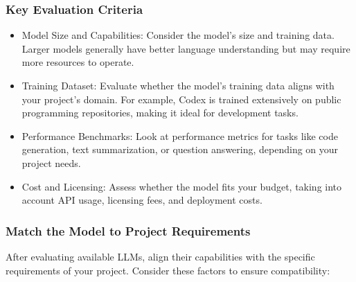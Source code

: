 \documentclass[14pt, a4paper]{article}
\begin{document}
\subsubsection*{Key Evaluation Criteria}

\begin{itemize}
    \item Model Size and Capabilities: Consider the model's size and training
    data. Larger models generally have better language understanding but may
    require more resources to operate.
    \item Training Dataset: Evaluate whether the model’s training data aligns
    with your project's domain. For example, Codex is trained extensively on
    public programming repositories, making it ideal for development tasks.
    \item Performance Benchmarks: Look at performance metrics for tasks like
    code generation, text summarization, or question answering, depending on
    your project needs.
    \item Cost and Licensing: Assess whether the model fits your budget, taking
    into account API usage, licensing fees, and deployment costs.
\end{itemize}

\subsubsection{Match the Model to Project Requirements}

After evaluating available LLMs, align their capabilities with the specific
requirements of your project. Consider these factors to ensure compatibility:
\end{document}
